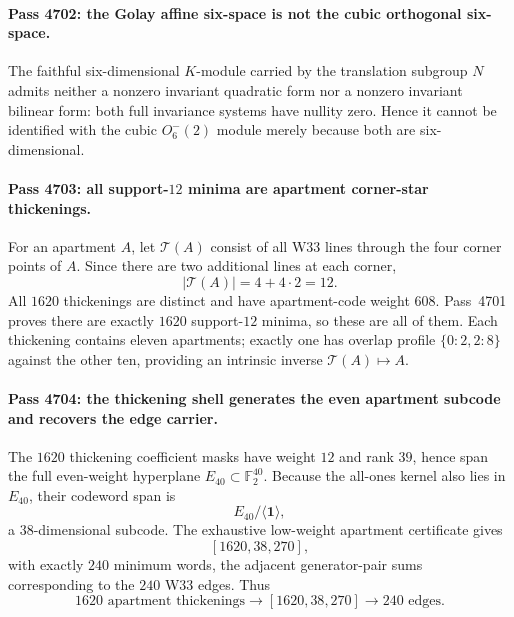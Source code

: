 \paragraph{Pass 4702: the Golay affine six-space is not the cubic orthogonal six-space.}
The faithful six-dimensional $K$-module carried by the translation subgroup $N$ admits neither a nonzero invariant quadratic form nor a nonzero invariant bilinear form: both full invariance systems have nullity zero.  Hence it cannot be identified with the cubic $O^-_6(2)$ module merely because both are six-dimensional.

\paragraph{Pass 4703: all support-$12$ minima are apartment corner-star thickenings.}
For an apartment $A$, let $\mathcal T(A)$ consist of all W33 lines through the four corner points of $A$.  Since there are two additional lines at each corner,
\[
|\mathcal T(A)|=4+4\cdot2=12.
\]
All $1620$ thickenings are distinct and have apartment-code weight $608$.  Pass~4701 proves there are exactly $1620$ support-$12$ minima, so these are all of them.  Each thickening contains eleven apartments; exactly one has overlap profile $\{0{:}2,2{:}8\}$ against the other ten, providing an intrinsic inverse $\mathcal T(A)\mapsto A$.

\paragraph{Pass 4704: the thickening shell generates the even apartment subcode and recovers the edge carrier.}
The $1620$ thickening coefficient masks have weight $12$ and rank $39$, hence span the full even-weight hyperplane $E_{40}\subset\mathbb F_2^{40}$.  Because the all-ones kernel also lies in $E_{40}$, their codeword span is
\[
E_{40}/\langle\mathbf1\rangle,
\]
a $38$-dimensional subcode.  The exhaustive low-weight apartment certificate gives
\[
\boxed{[1620,38,270]},
\]
with exactly $240$ minimum words, the adjacent generator-pair sums corresponding to the $240$ W33 edges.  Thus
\[
1620\text{ apartment thickenings}\longrightarrow [1620,38,270]\longrightarrow240\text{ edges}.
\]

\begin{center}
\end{center}
